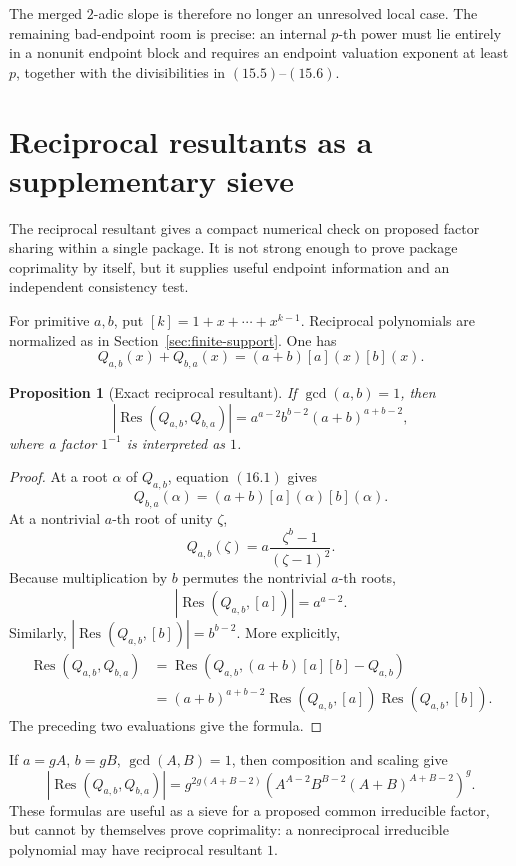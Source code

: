 \documentclass[11pt]{article}
\newtheorem{proposition}[theorem]{Proposition}
\theoremstyle{definition}
\newcommand{\Res}{\operatorname{Res}}
\begin{document}
The merged \(2\)-adic slope is therefore no longer an unresolved local
case.  The remaining bad-endpoint room is precise: an internal \(p\)-th
power must lie entirely in a nonunit endpoint block and requires an endpoint
valuation exponent at least \(p\), together with the divisibilities in
\((15.5)\)--\((15.6)\).

\section{Reciprocal resultants as a supplementary sieve}

The reciprocal resultant gives a compact numerical check on proposed factor sharing within a single package.  It is not strong enough to prove package coprimality by itself, but it supplies useful endpoint information and an independent consistency test.

For primitive \(a,b\), put \([k]=1+x+\cdots+x^{k-1}\).  Reciprocal
polynomials are normalized as in Section~\ref{sec:finite-support}.  One has
\begin{equation}
 Q_{a,b}(x)+Q_{b,a}(x)=(a+b)[a](x)[b](x).
 \tag{16.1}
\end{equation}

\begin{proposition}[Exact reciprocal resultant]
If \(\gcd(a,b)=1\), then
\begin{equation}
 \left|\Res(Q_{a,b},Q_{b,a})\right|
 =a^{a-2}b^{b-2}(a+b)^{a+b-2},
 \tag{16.2}
\end{equation}
where a factor \(1^{-1}\) is interpreted as \(1\).
\end{proposition}

\begin{proof}
At a root \(\alpha\) of \(Q_{a,b}\), equation \((16.1)\) gives
\[
 Q_{b,a}(\alpha)=(a+b)[a](\alpha)[b](\alpha).
\]
At a nontrivial \(a\)-th root of unity \(\zeta\),
\[
 Q_{a,b}(\zeta)=a\frac{\zeta^b-1}{(\zeta-1)^2}.
\]
Because multiplication by \(b\) permutes the nontrivial \(a\)-th roots,
\[
 |\Res(Q_{a,b},[a])|=a^{a-2}.
\]
Similarly, \(|\Res(Q_{a,b},[b])|=b^{b-2}\).  More explicitly,
\begin{align*}
 \Res(Q_{a,b},Q_{b,a})
 &=\Res\!\left(Q_{a,b},(a+b)[a][b]-Q_{a,b}\right)\\
 &=(a+b)^{a+b-2}
   \Res(Q_{a,b},[a])\Res(Q_{a,b},[b]).
\end{align*}
The preceding two evaluations give the formula.
\end{proof}

If \(a=gA\), \(b=gB\), \(\gcd(A,B)=1\), then composition and scaling give
\begin{equation}
 \left|\Res(Q_{a,b},Q_{b,a})\right|
 =g^{2g(A+B-2)}
 \left(A^{A-2}B^{B-2}(A+B)^{A+B-2}\right)^g.
 \tag{16.3}
\end{equation}
These formulas are useful as a sieve for a proposed common irreducible factor,
but cannot by themselves prove coprimality: a nonreciprocal irreducible
polynomial may have reciprocal resultant \(1\).
\end{document}
